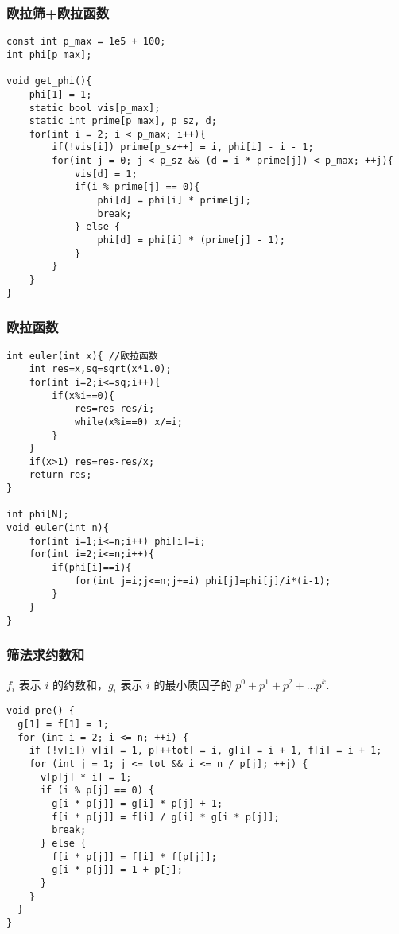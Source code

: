 \documentclass[]{article}
\begin{document}
\hypertarget{ux6b27ux62c9ux7b5bux6b27ux62c9ux51fdux6570}{%
\subsubsection{欧拉筛+欧拉函数}\label{ux6b27ux62c9ux7b5bux6b27ux62c9ux51fdux6570}}

\begin{verbatim}
const int p_max = 1e5 + 100;
int phi[p_max];

void get_phi(){
    phi[1] = 1;
    static bool vis[p_max];
    static int prime[p_max], p_sz, d;
    for(int i = 2; i < p_max; i++){
        if(!vis[i]) prime[p_sz++] = i, phi[i] - i - 1;
        for(int j = 0; j < p_sz && (d = i * prime[j]) < p_max; ++j){
            vis[d] = 1;
            if(i % prime[j] == 0){
                phi[d] = phi[i] * prime[j];
                break;
            } else {
                phi[d] = phi[i] * (prime[j] - 1);
            }
        }
    }
}
\end{verbatim}

\hypertarget{ux6b27ux62c9ux51fdux6570}{%
\subsubsection{欧拉函数}\label{ux6b27ux62c9ux51fdux6570}}

\begin{verbatim}
int euler(int x){ //欧拉函数
    int res=x,sq=sqrt(x*1.0);
    for(int i=2;i<=sq;i++){
        if(x%i==0){
            res=res-res/i;
            while(x%i==0) x/=i;
        }
    }
    if(x>1) res=res-res/x;
    return res;
}

int phi[N];
void euler(int n){
    for(int i=1;i<=n;i++) phi[i]=i;
    for(int i=2;i<=n;i++){
        if(phi[i]==i){
            for(int j=i;j<=n;j+=i) phi[j]=phi[j]/i*(i-1);
        }
    }
}

\end{verbatim}

\hypertarget{ux7b5bux6cd5ux6c42ux7ea6ux6570ux548c}{%
\subsubsection{筛法求约数和}\label{ux7b5bux6cd5ux6c42ux7ea6ux6570ux548c}}

\(f_i\) 表示 \(i\) 的约数和，\(g_i\) 表示 \(i\) 的最小质因子的
\(p^0+p^1+p^2+\dots p^k\).

\begin{verbatim}
void pre() {
  g[1] = f[1] = 1;
  for (int i = 2; i <= n; ++i) {
    if (!v[i]) v[i] = 1, p[++tot] = i, g[i] = i + 1, f[i] = i + 1;
    for (int j = 1; j <= tot && i <= n / p[j]; ++j) {
      v[p[j] * i] = 1;
      if (i % p[j] == 0) {
        g[i * p[j]] = g[i] * p[j] + 1;
        f[i * p[j]] = f[i] / g[i] * g[i * p[j]];
        break;
      } else {
        f[i * p[j]] = f[i] * f[p[j]];
        g[i * p[j]] = 1 + p[j];
      }
    }
  }
}
\end{verbatim}
\end{document}
